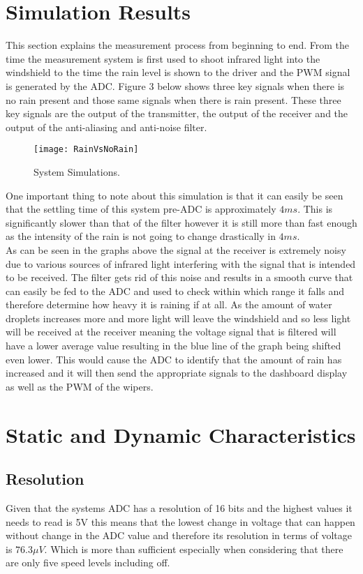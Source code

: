 \documentclass[conference, 11pt]{IEEEtran}
\begin{document}
\section{Simulation Results}
This section explains the measurement process from beginning to end. From the time the measurement system is first used to shoot infrared light into the windshield to the time the rain level is shown to the driver and the PWM signal is generated by the ADC. Figure 3 below shows three key signals when there is no rain present and those same signals when there is rain present. These three key signals are the output of the transmitter, the output of the receiver and the output of the anti-aliasing and anti-noise filter. 

 \begin{figure}[]
 \centering 
 \texttt{[image: RainVsNoRain]}
 \centering 
  \caption {System Simulations. }
 \end{figure}

One important thing to note about this simulation is that it can easily be seen that the settling time of this system pre-ADC is approximately $4ms$. This is significantly slower than that of the filter however it is still more than fast enough as the intensity of the rain is not going to change drastically in $4ms$. \\

As can be seen in the graphs above the signal at the receiver is extremely noisy due to various sources of infrared light interfering with the signal that is intended to be received. The filter gets rid of this noise and results in a smooth curve that can easily be fed to the ADC and used to check within which range it falls and therefore determine how heavy it is raining if at all. As the amount of water droplets increases more and more light will leave the windshield and so less light will be received at the receiver meaning the voltage signal that is filtered will have a lower average value resulting in the blue line of the graph being shifted even lower. This would cause the ADC to identify that the amount of rain has increased and it will then send the appropriate signals to the dashboard display as well as the PWM of the wipers. 


\section{Static and Dynamic Characteristics}

\subsection{Resolution}
Given that the systems ADC has a resolution of 16 bits and the highest values it needs to read is 5V this means that the lowest change in voltage  that can happen without change in the ADC value and therefore its resolution in terms of voltage is $76.3\mu V$. Which  is more than sufficient especially when considering that there are only five speed levels including off. 
\end{document}
